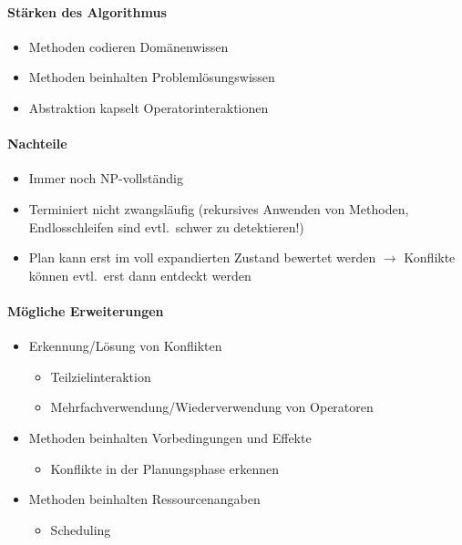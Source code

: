 \paragraph{Stärken des Algorithmus}
\begin{itemize}
	\item Methoden codieren Domänenwissen
	\item Methoden beinhalten Problemlösungswissen
	\item Abstraktion kapselt Operatorinteraktionen
\end{itemize}
\paragraph{Nachteile}
\begin{itemize}
	\item Immer noch NP-vollständig
	\item Terminiert nicht zwangsläufig (rekursives Anwenden von Methoden, Endlosschleifen sind evtl.\ schwer zu detektieren!)
	\item Plan kann erst im voll expandierten Zustand bewertet werden $\rightarrow$ Konflikte können evtl.\ erst dann entdeckt werden
\end{itemize}
\paragraph{Mögliche Erweiterungen}
\begin{itemize}
	\item Erkennung/Lösung von Konflikten
	\begin{itemize}
		\item Teilzielinteraktion
		\item Mehrfachverwendung/Wiederverwendung von Operatoren
	\end{itemize}
	\item Methoden beinhalten Vorbedingungen und Effekte
	\begin{itemize}
		\item Konflikte in der Planungsphase erkennen
	\end{itemize}
	\item Methoden beinhalten Ressourcenangaben
	\begin{itemize}
		\item Scheduling
	\end{itemize}
\end{itemize}